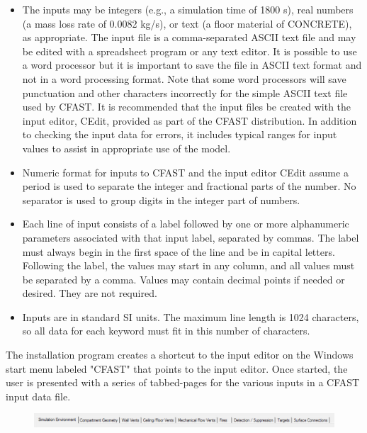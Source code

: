 \begin{itemize}
\item The inputs may be integers (e.g., a simulation time of 1800 s), real numbers (a mass loss rate of 0.0082 kg/s), or text (a floor material of CONCRETE), as appropriate. The input file is a comma-separated ASCII text file and may be edited with a spreadsheet program or any text editor. It is possible to use a word processor but it is important to save the file in ASCII text format and not in a word processing format. Note that some word processors will save punctuation and other characters incorrectly for the simple ASCII text file used by CFAST. It is recommended that the input files be created with the input editor, CEdit, provided as part of the CFAST distribution.  In addition to checking the input data for errors, it includes typical ranges for input values to assist in appropriate use of the model.

\item Numeric format for inputs to CFAST and the input editor CEdit assume a period is used to separate the integer and fractional parts of the number. No separator is used to group digits in the integer part of numbers.

\item Each line of input consists of a label followed by one or more alphanumeric parameters associated with that input label, separated by commas.  The label must always begin in the first space of the line and be in capital letters.  Following the label, the values may start in any column, and all values must be separated by a comma.  Values may contain decimal points if needed or desired.  They are not required.  

\item Inputs are in standard SI units.  The maximum line length is 1024 characters, so all data for each keyword must fit in this number of characters.
\end{itemize}

The installation program creates a shortcut to the input editor on the Windows start menu labeled "CFAST" that points to the input editor.  Once started, the user is presented with a series of tabbed-pages for the various inputs in a CFAST input data file.

\begin{figure}[h!]
\begin{center}
\includegraphics[width=6.5in]{FIGURES/Input_File/Tabs}
\end{center}
\end{figure}

